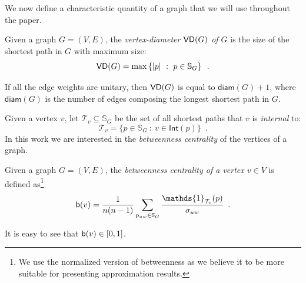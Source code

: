 We now define a characteristic quantity of a graph that we will use throughout
the paper.
\begin{definition}\label{def:vertexdiam}
  Given a graph $G=(V,E)$, the \emph{vertex-diameter $\mathsf{VD}(G)$ of $G$} is the
  size of the shortest path in $G$ with maximum size:
  \[
  \mathsf{VD}(G) = \max\left\{|p| ~:~ p\in \mathbb{S}_G\right\}\enspace.\]
\end{definition}
If all the edge weights are unitary, then $\mathsf{VD}(G)$ is equal to
$\mathsf{diam}(G)+1$, where $\mathsf{diam}(G)$ is the number of edges composing
the longest shortest path in $G$. 

Given a vertex $v$, let $\mathcal{T}_v\subseteq\mathbb{S}_G$ be the set of all
shortest paths that $v$ is \emph{internal} to:
\[
\mathcal{T}_v=\{p\in\mathbb{S}_G ~:~ v\in\mathsf{Int}(p)\}\enspace.
\]
In this work we are interested in the \emph{betweenness centrality} of the
vertices of a graph.

\begin{definition}\label{def:betwenness}
  \citep{Anthonisse71,Freeman77} Given a graph $G=(V,E)$, the \emph{betweenness
  centrality of a vertex $v\in V$} is defined as\footnote{We use the normalized
  version of betweenness as we believe it to be more suitable for presenting
  approximation results.}
  \[
  \betw(v)=\frac{1}{n(n-1)}\sum_{p_{uw}\in\mathbb{S}_G}\frac{\mathds{1}_{\mathcal{T}_v}(p)}{\sigma_{uw}}%
  \enspace.
  \]
\end{definition} 
It is easy to see that $\mathsf{b}(v)\in[0,1]$. 

